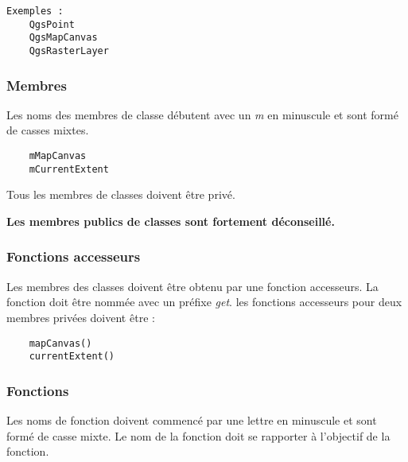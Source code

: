 \begin{verbatim}
Exemples :
	QgsPoint
	QgsMapCanvas
	QgsRasterLayer
\end{verbatim}

\subsubsection{Membres}
Les noms des membres de classe d\'ebutent avec un \textit{m} en minuscule et sont form\'e de casses mixtes.

\begin{verbatim}
	mMapCanvas	
	mCurrentExtent
\end{verbatim}

Tous les membres de classes doivent \^etre priv\'e.

\textbf{Les membres publics de classes sont fortement d\'econseill\'e.}

\subsubsection{Fonctions accesseurs}
Les membres des classes doivent \^etre obtenu par une fonction accesseurs. La fonction doit \^etre nomm\'ee avec un pr\'efixe \textit{get}. les fonctions accesseurs pour deux membres priv\'ees doivent \^etre :
\begin{verbatim}
	mapCanvas()
	currentExtent()
\end{verbatim}

\subsubsection{Fonctions}
Les noms de fonction doivent commenc\'e par une lettre en minuscule et sont form\'e de casse mixte. Le nom de la fonction doit se rapporter \`a l'objectif de la fonction.

